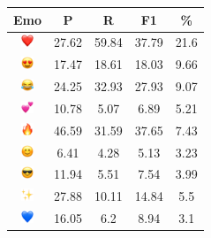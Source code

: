 \documentclass{article}
\begin{document}
\begin{table}
\centering
\begin{tabular}{|c|ccc|c|} \hline
\textbf{Emo} & \textbf{P} & \textbf{R} & \textbf{F1} & \textbf{\%} \\ \hline
\includegraphics[height=0.37cm,width=0.37cm]{img/red_heart.png} & 27.62 & 59.84 & 37.79 & 21.6\\ 
\includegraphics[height=0.37cm,width=0.37cm]{img/smiling_face_with_hearteyes.png} & 17.47 & 18.61 & 18.03 & 9.66\\ 
\includegraphics[height=0.37cm,width=0.37cm]{img/face_with_tears_of_joy.png} & 24.25 & 32.93 & 27.93 & 9.07\\ 
\includegraphics[height=0.37cm,width=0.37cm]{img/two_hearts.png} & 10.78 & 5.07 & 6.89 & 5.21\\ 
\includegraphics[height=0.37cm,width=0.37cm]{img/fire.png} & 46.59 & 31.59 & 37.65 & 7.43\\ 
\includegraphics[height=0.37cm,width=0.37cm]{img/smiling_face_with_smiling_eyes.png} & 6.41 & 4.28 & 5.13 & 3.23\\ 
\includegraphics[height=0.37cm,width=0.37cm]{img/smiling_face_with_sunglasses.png} & 11.94 & 5.51 & 7.54 & 3.99\\ 
\includegraphics[height=0.37cm,width=0.37cm]{img/sparkles.png} & 27.88 & 10.11 & 14.84 & 5.5\\ 
\includegraphics[height=0.37cm,width=0.37cm]{img/blue_heart.png} & 16.05 & 6.2 & 8.94 & 3.1\\ 

\end{tabular}
\end{table}
\end{document}
